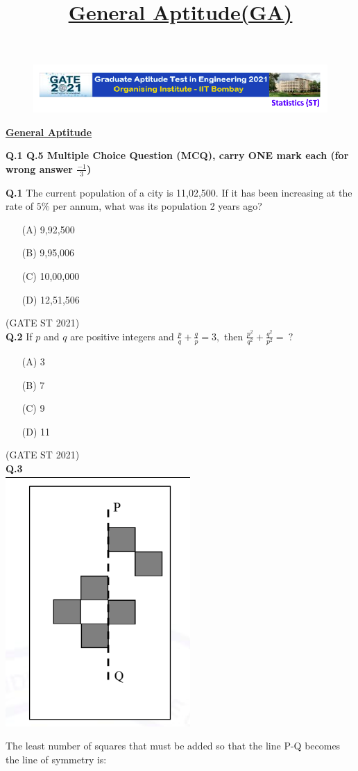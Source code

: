 \documentclass[journal,12pt,onecolumn]{IEEEtran}
\title{\textbf{\underline{General Aptitude(GA)}}}
\author{}
\date{}
\theoremstyle{remark}
\begin{document}
\begin{figure}
 \centering
    \includegraphics[width=1\linewidth]{figs/0.png} 
\end{figure}

\textbf{\underline{General Aptitude}}

\textbf{Q.1 \text{-} Q.5 Multiple Choice Question (MCQ), carry ONE mark each (for wrong answer $\frac{-1}{3}$)}

\textbf{Q.1} 
The current population of a city is 11,02,500. If it has been increasing at the rate of $5\%$ per annum, what was its population 2 years ago?

\begin{enumerate}
\item[(A)] 9,92,500
\item[(B)] 9,95,006
\item[(C)] 10,00,000
\item[(D)] 12,51,506
\end{enumerate}

\hfill (GATE ST 2021)\\

\textbf{Q.2}
If $p$ and $q$ are positive integers and
$
\frac{p}{q} + \frac{q}{p} = 3,
$
then
$
\frac{p^{2}}{q^{2}} + \frac{q^{2}}{p^{2}} = \ ?
$
\begin{enumerate}
\item[(A)] 3
\item[(B)] 7
\item[(C)] 9
\item[(D)] 11
\end{enumerate}

\hfill (GATE ST 2021) \\

\textbf{Q.3}    \\
\includegraphics[width=0.2\linewidth]{figs/3.png} 


The least number of squares that must be added so that the line P-Q becomes the line of symmetry is:
\end{document}
